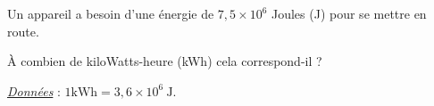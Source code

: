 
Un appareil a besoin d'une énergie de $7,5 \times 10^{6}$ Joules (J) pour se mettre en route.

À combien de kiloWatts-heure (kWh) cela correspond-il ?


\hfill{}\underline{\textit{Données}} : $1 \text{kWh}=3,6 \times 10^{6}~ \text{J}$.

\smallskip

